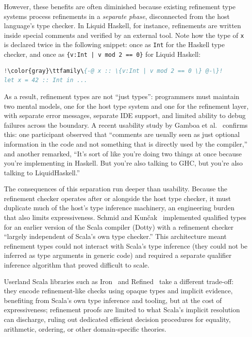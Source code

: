 \documentclass[acmsmall]{acmart}
\begin{document}
However, these benefits are often diminished because existing refinement type systems process refinements in a \emph{separate phase}, disconnected from the host language's type checker. In Liquid Haskell, for instance, refinements are written inside special comments and verified by an external tool. Note how the type of \lstinline!x! is declared twice in the following snippet: once as \lstinline!Int! for the Haskell type checker, and once as \lstinline!{v:Int | v mod 2 == 0}! for Liquid Haskell:
%
\begin{lstlisting}[language=Haskell,escapechar=!]
!\color{gray}\ttfamily\{-@ x :: \{v:Int | v mod 2 == 0 \} @-\}!
let x = 42 :: Int in ...
\end{lstlisting}
%
As a result, refinement types are not ``just types'': programmers must maintain two mental models, one for the host type system and one for the refinement layer, with separate error messages, separate IDE support, and limited ability to debug failures across the boundary. A recent usability study by Gamboa et al.~\cite{gamboa2025} confirms this: one participant observed that ``comments are usually seen as just optional information in the code and not something that is directly used by the compiler,'' and another remarked, ``It's sort of like you're doing two things at once because you're implementing in Haskell. But you're also talking to GHC, but you're also talking to LiquidHaskell.''

The consequences of this separation run deeper than usability. Because the refinement checker operates after or alongside the host type checker, it must duplicate much of the host's type inference machinery, an engineering burden that also limits expressiveness. Schmid and Kun\v{c}ak~\cite{schmid2016} implemented qualified types for an earlier version of the Scala compiler (Dotty) with a refinement checker ``largely independent of Scala's own type checker.'' This architecture meant refinement types could not interact with Scala's type inference (they could not be inferred as type arguments in generic code) and required a separate qualifier inference algorithm that proved difficult to scale.

Userland Scala libraries such as Iron~\cite{iron} and Refined~\cite{refined} take a different trade-off: they encode refinement-like checks using opaque types and implicit evidence, benefiting from Scala's own type inference and tooling, but at the cost of expressiveness; refinement proofs are limited to what Scala's implicit resolution can discharge, ruling out dedicated efficient decision procedures for equality, arithmetic, ordering, or other domain-specific theories.
\end{document}
